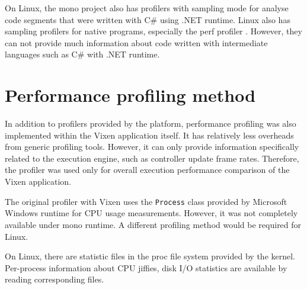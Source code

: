 On Linux, the mono project also has profilers with sampling mode for analyse code segments that were written with C\# using .NET runtime. Linux also has sampling profilers for native programs, especially the perf profiler \cite{de2010new}. However, they can not provide much information about code written with intermediate languages such as C\# with .NET runtime.

\section{Performance profiling method}

In addition to profilers provided by the platform, performance profiling was also implemented within the Vixen application itself. It has relatively less overheads from generic profiling tools. However, it can only provide information specifically related to the execution engine, such as controller update frame rates. Therefore, the profiler was used only for overall execution performance comparison of the Vixen application.

The original profiler with Vixen uses the \texttt{Process} class provided by Microsoft Windows runtime for CPU usage measurements. However, it was not completely available under mono runtime. A different profiling method would be required for Linux.

On Linux, there are statistic files in the proc file system \cite{proc} provided by the kernel. Per-process information about CPU jiffies, disk I/O statistics are available by reading corresponding files.


